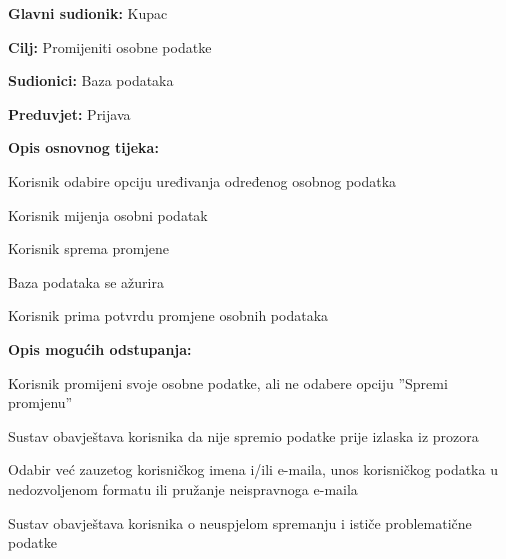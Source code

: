 					\noindent {}
					\begin{packed_item}
						
						\item \textbf{Glavni sudionik: } Kupac
						\item  \textbf{Cilj:} Promijeniti osobne podatke
						\item  \textbf{Sudionici:} Baza podataka
						\item  \textbf{Preduvjet:} Prijava
						\item  \textbf{Opis osnovnog tijeka:} 
						
						\item[] \begin{packed_enum}
							
							\item Korisnik odabire opciju uređivanja određenog osobnog podatka
							\item Korisnik mijenja osobni podatak
							\item Korisnik sprema promjene
							\item Baza podataka se ažurira
							\item Korisnik prima potvrdu promjene osobnih podataka
						\end{packed_enum}
						
						\item  \textbf{Opis mogućih odstupanja:}
						
						\item[] \begin{packed_item}
							
							\item[2.a] Korisnik promijeni svoje osobne podatke, ali ne odabere opciju ”Spremi promjenu”
							\item[] \begin{packed_enum}
								
								\item Sustav obavještava korisnika da nije spremio podatke prije izlaska
								iz prozora
								
							\end{packed_enum}
							\item[3.a] Odabir već zauzetog korisničkog imena i/ili e-maila, unos korisničkog
							podatka u nedozvoljenom formatu ili pružanje neispravnoga e-maila
							\item[] \begin{packed_enum}
								
								\item Sustav obavještava korisnika o neuspjelom spremanju i ističe problematične podatke
								
							\end{packed_enum}
							
						\end{packed_item}
					\end{packed_item}
					
